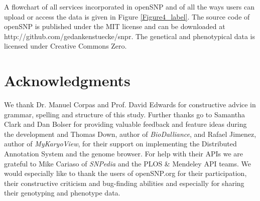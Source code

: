 \documentclass[10pt]{article}
\begin{document}
A flowchart of all services incorporated in openSNP and of all the ways users can upload or access the data is given in Figure \ref{Figure4_label}. The source code of openSNP is 
published under the MIT license and can be downloaded at http://github.com/gedankenstuecke/snpr. The genetical and phenotypical data is licensed under Creative Commons Zero. 
\section*{Acknowledgments}
We thank Dr. Manuel Corpas and Prof. David Edwards for constructive advice in grammar, spelling and structure of this study. Further thanks go to Samantha Clark and Dan Bolser for providing valuable feedback and feature ideas during the development and Thomas Down, author of \emph{BioDalliance}, and Rafael Jimenez, author of \emph{MyKaryoView}, for their support on implementing the Distributed Annotation System and the genome browser. For help with their APIs we are grateful to Mike Cariaso of \emph{SNPedia} and the PLOS \& Mendeley API teams. We would especially like to thank the users of openSNP.org for their participation, their constructive criticism and bug-finding abilities and especially for sharing their genotyping and phenotype data.


\end{document}

